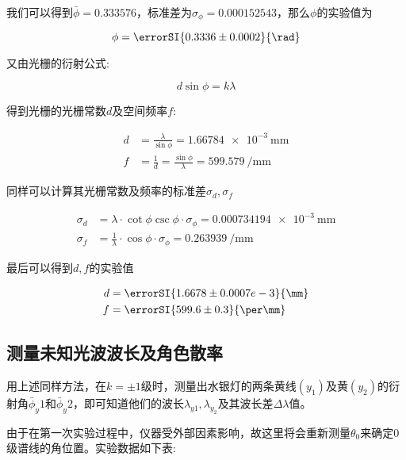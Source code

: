 \documentclass[a4paper]{article}
\begin{document}
\begin{changemargin}{1cm}{1cm}
    我们可以得到$\bar\phi=0.333576$，标准差为$\sigma_{\phi}=0.000152543$，那么$\phi$的实验值为

    $$\phi=\errorSI{0.3336 \pm 0.0002}{\rad}$$

    又由光栅的衍射公式:

    $$d\sin{\phi}=k\lambda$$

    得到光栅的光栅常数$d$及空间频率$f$:

    $$\begin{aligned}
            d & =\frac{\lambda}{\sin{\phi}}=\SI{1.66784e-3}{\mm}              \\
            f & =\frac{1}{d}=\frac{\sin{\phi}}{\lambda}=\SI{599.579}{\per\mm}
        \end{aligned}$$

    同样可以计算其光栅常数及频率的标准差$\sigma_d,\sigma_f$

    $$\begin{aligned}
            \sigma_d & =\lambda\cdot\cot{\phi}\csc{\phi}\cdot\sigma_\phi=\SI{0.000734194e-3}{\mm} \\
            \sigma_f & =\frac{1}{\lambda}\cdot\cos{\phi}\cdot\sigma_\phi=\SI{0.263939}{\per\mm}
        \end{aligned}$$

    最后可以得到$d,f$的实验值

    $$\begin{aligned}
            d & =\errorSI{1.6678\pm 0.0007e-3}{\mm} \\
            f & =\errorSI{599.6\pm 0.3}{\per\mm}
        \end{aligned}$$

    \subsection{测量未知光波波长及角色散率}
    用上述同样方法，在$k=\pm1$级时，测量出水银灯的两条黄线$(y_1)$及黄$(y_2)$的衍射角$\bar\phi_y1$和$\bar\phi_y2$，即可知道他们的波长$\lambda_{y1},\lambda_{y_2}$及其波长差$\Delta\lambda$值。\par

    由于在第一次实验过程中，仪器受外部因素影响，故这里将会重新测量$\theta_0$来确定0级谱线的角位置。实验数据如下表:


\end{changemargin}
\end{document}
